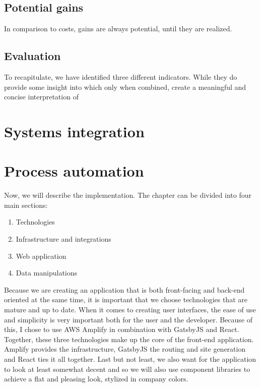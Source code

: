 \documentclass[12pt,oneside]{fithesis2}
\begin{document}
\section*{Potential gains}
In comparison to costs, gains are always potential, until they are realized. 

\section{Evaluation}
To recapitulate, we have identified three different indicators. While they do provide some insight into which only when combined, create a meaningful and concise interpretation of 

\chapter{Systems integration}

\chapter{Process automation}
Now, we will describe the implementation. The chapter can be divided into four main sections:
\begin{enumerate}
    \setlength\itemsep{0em}
    \item Technologies
    \item Infrastructure and integrations
    \item Web application
    \item Data manipulations
\end{enumerate}

Because we are creating an application that is both front-facing and back-end oriented at the same time, it is important that we choose technologies that are mature and up to date.
When it comes to creating user interfaces, the ease of use and simplicity is very important both for the user and the developer. Because of this, I chose to use AWS Amplify in combination with GatsbyJS and React. Together, these three technologies make up the core of the front-end application. Amplify provides the infrastructure, GatsbyJS the routing and site generation and React ties it all together. Last but not least, we also want for the application to look at least somewhat decent and so we will also use component libraries to achieve a flat and pleasing look, stylized in company colors.
\end{document}
